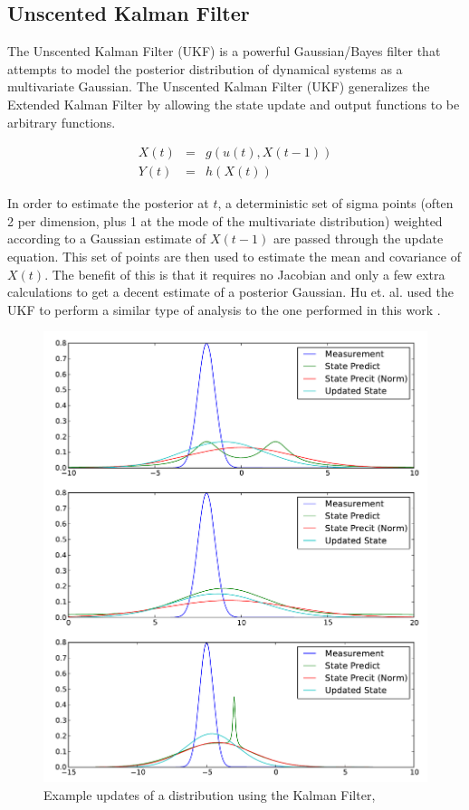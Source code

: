 \subsection{Unscented Kalman Filter}
\label{sec:Unscented Kalman Filter}
The Unscented Kalman Filter (UKF) is a powerful Gaussian/Bayes filter that attempts
to model the posterior distribution of dynamical systems as a multivariate
Gaussian. The Unscented Kalman Filter (UKF) generalizes the Extended Kalman
Filter by allowing the state update and output functions to be arbitrary functions.

\begin{eqnarray}
X(t) &=& g(u(t), X(t-1))\\
Y(t) &=& h(X(t))
\end{eqnarray}

In order to estimate the posterior at $t$, a deterministic set of sigma points 
(often 2 per dimension, plus 1 at the mode of the multivariate distribution)
weighted according to a Gaussian estimate of $X(t-1)$ are passed through
the update equation. This set of points are then used to estimate the 
mean and covariance of $X(t)$. The benefit of this is that it requires
no Jacobian and only a few extra calculations to get a decent estimate of
a posterior Gaussian. Hu et. al. used the UKF to  perform a similar type of analysis to
the one performed in this work \cite{Hu2009}. 

\begin{figure}
\includegraphics[width=16cm]{images/kalman}
\caption{Example updates of a distribution using the Kalman Filter, \cite{Thrun2005}}
\label{fig:EKFWorking}
\end{figure}

